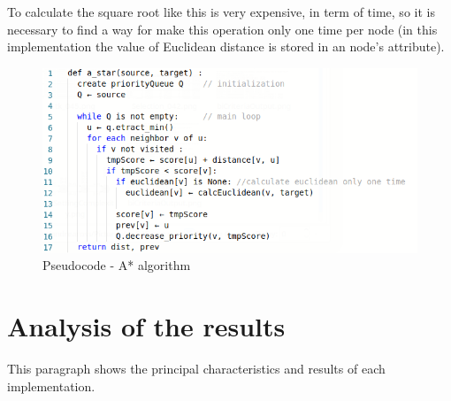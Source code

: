 \documentclass[a4paper,11pt]{report}
\begin{document}
To calculate the square root like this is very expensive, in term of time, so it is necessary to find a way for make this operation only one time per node (in this implementation the value of Euclidean distance is stored in an node's attribute).
\begin{figure}[h]
	\centering
	\includegraphics[width=\linewidth]{img/A_StarPseudocode.png}
	\caption{Pseudocode - A* algorithm}
	\label{fig:aStarAlgorithm}
\end{figure}



\section{Analysis of the results}
This paragraph shows the principal characteristics and results of each implementation.
\end{document}
